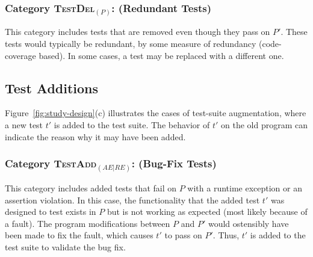 \documentclass[conference]{IEEEtran}
\newcommand{\subject}[1]{\texttt{\small #1}}
\newcommand{\mt}{\mathit}
\newcommand{\catdelp}{\textsc{TestDel}$_\mt{(P)}$}
\newcommand{\cataddaere}{\textsc{TestAdd}$_\mt{(AE|RE)}$}
\begin{document}
\subsubsection{Category \catdelp: (Redundant Tests)}
\label{sec:category-delp}

This category includes tests that are removed even though they pass on
$P'$. These tests would typically be redundant, by some measure of
redundancy (\eg code-coverage based). In some cases, a test may be
replaced with a different one.




\subsection{Test Additions}
\label{sec:test-add}

Figure~\ref{fig:study-design}(c) illustrates the cases of test-suite
augmentation, where a new test $t'$ is added to the test suite. The
behavior of $t'$ on the old program can indicate the reason why it may
have been added.

\subsubsection{Category \cataddaere: (Bug-Fix Tests)}
\label{sec:category-addaere}

This category includes added tests that fail on $P$ with a runtime
exception or an assertion violation. In this case, the functionality
that the added test $t'$ was designed to test exists in $P$ but is not
working as expected (most likely because of a fault). The program
modifications between $P$ and $P'$ would ostensibly have been made to
fix the fault, which causes $t'$ to pass on $P'$. Thus, $t'$ is added
to the test suite to validate the bug fix.
\end{document}
